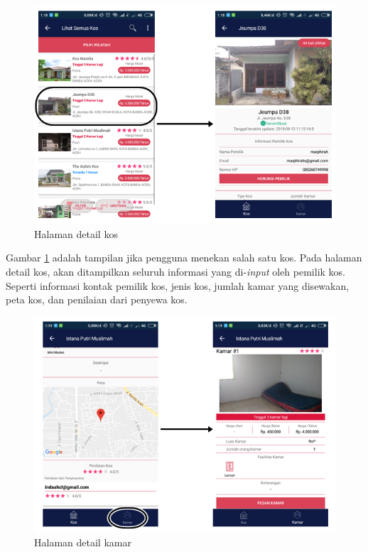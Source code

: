 		\begin{figure}[H]
			\centering
			\includegraphics[width=\textwidth]{gambar/and/and2}
			\caption{Halaman detail kos}
			\label{and7}
		\end{figure}
	
		Gambar \ref{and7} adalah tampilan jika pengguna menekan salah satu kos. Pada halaman detail kos, akan ditampilkan seluruh informasi yang di-\textit{input} oleh pemilik kos. Seperti informasi kontak pemilik kos, jenis kos, jumlah kamar yang disewakan, peta kos, dan penilaian dari penyewa kos.
		
		\begin{figure}[H]
			\centering
			\includegraphics[width=\textwidth]{gambar/and/and3}
			\caption{Halaman detail kamar}
			\label{and8}
		\end{figure}
	
